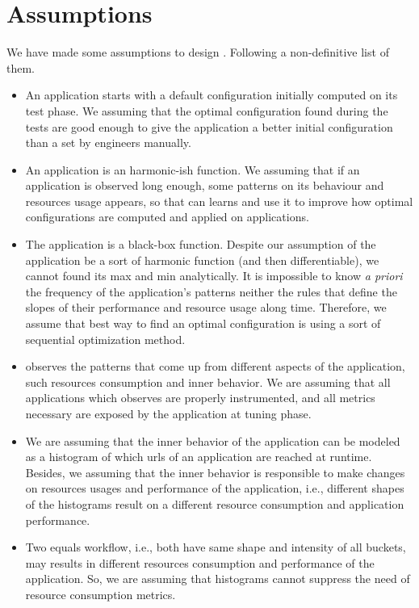 \section{Assumptions}

We have made some assumptions to design \name. Following a non-definitive list of them.

\begin{itemize}

\item An application starts with a default configuration initially computed on its test phase. We assuming that the
optimal configuration found during the tests are good enough to give the application a better initial configuration
than a set by engineers manually.

\item An application is an harmonic-ish function. We assuming that if an application is observed long enough, some
patterns on its behaviour and resources usage appears, so that \name can learns and use it to improve how optimal
configurations are computed and applied on applications.

\item The application is a black-box function. Despite our assumption of the application be a sort of harmonic function
(and then differentiable), we cannot found its max and min analytically. It is impossible to know \textit{a priori} the
frequency of the application's patterns neither the rules that define the slopes of their performance and resource
usage along time. Therefore, we assume that best way to find an optimal configuration is using a sort of sequential
optimization method.

\item \name observes the patterns that come up from different aspects of the application, such resources consumption
and inner behavior. We are assuming that all applications which \name observes are properly instrumented, and all
metrics necessary are exposed by the application at tuning phase.

\item We are assuming that the inner behavior of the application can be modeled as a histogram of which urls of an
application are reached at runtime. Besides, we assuming that the inner behavior is responsible to make changes on
resources usages and performance of the application, i.e., different shapes of the histograms result on a different
resource consumption and application performance.

\item Two equals workflow, i.e., both have same shape and intensity of all buckets, may results in different resources
consumption and performance of the application. So, we are assuming that histograms cannot suppress the need of
resource consumption metrics.


\end{itemize}
